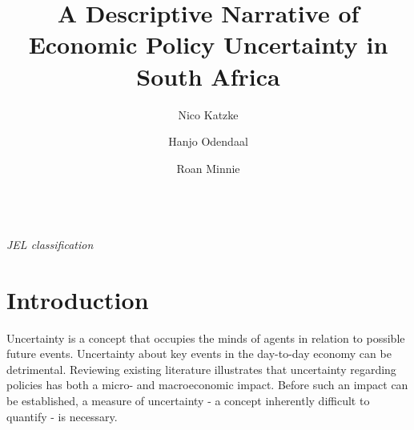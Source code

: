 \documentclass[11pt,preprint, authoryear]{elsarticle}
\numberwithin{equation}{section}
\numberwithin{figure}{section}
\numberwithin{table}{section}
\begin{document}
\begin{frontmatter}  %

\title{A Descriptive Narrative of Economic Policy Uncertainty in South Africa}



\author[Add1]{Nico Katzke}

\author[Add2]{Hanjo Odendaal}

\author[Add3]{Roan Minnie}

\address[Add1]{Stellenbosch University, Stellenbosch, South Africa; Prescient Securities, Cape Town, South Africa}
\address[Add2]{Stellenbosch University, Stellenbosch, South Africa; Bureau of Economic
Research, South Africa}
\address[Add3]{Stellenbosch University, Stellenbosch, South Africa}



\vspace{1cm}

\begin{keyword}
\footnotesize{
 \\ \vspace{0.3cm}
\textit{JEL classification} 
}
\end{keyword}
\vspace{0.5cm}
\end{frontmatter}



\pagestyle{fancy}
\chead{}
\rhead{}
\lfoot{}
\lhead{}
\cfoot{}


\headsep 35pt %




\section{\texorpdfstring{Introduction
\label{sec_intro}}{Introduction }}\label{introduction}

Uncertainty is a concept that occupies the minds of agents in relation
to possible future events. Uncertainty about key events in the
day-to-day economy can be detrimental. Reviewing existing literature
illustrates that uncertainty regarding policies has both a micro- and
macroeconomic impact. Before such an impact can be established, a measure of uncertainty - a concept inherently difficult to quantify - is necessary. 
\end{document}
